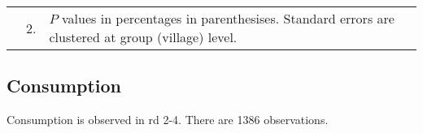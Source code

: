 \begin{minipage}[t]{14cm}
\begin{tabular}{>{\hfill\scriptsize}p{1cm}<{}>{\hfill\scriptsize}p{.25cm}<{}>{\scriptsize}p{12cm}<{\hfill}}
& 2. & $P$ values in percentages in parenthesises. Standard errors are clustered at group (village) level.
\end{tabular}
\end{minipage}
\subsection{Consumption}



Consumption is observed in rd 2-4. There are 1386 observations. 









